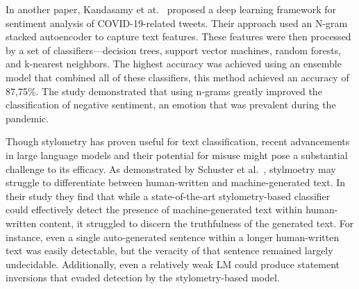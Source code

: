 \documentclass[twoside]{ctuthesis}
\theoremstyle{plain}
\theoremstyle{definition}
\theoremstyle{note}
\begin{document}
In another paper, Kandasamy et at.~\cite{Kandasamy2021COVID} proposed a deep learning framework for sentiment analysis of COVID-19-related tweets. Their approach used an N-gram stacked autoencoder to capture text features. These features were then processed by a set of classifiers—decision trees, support vector machines, random forests, and k‑nearest neighbors. The highest accuracy was achieved using an ensemble model that combined all of these classifiers, this method achieved an accuracy of 87,75\%. The study demonstrated that using n‑grams greatly improved the classification of negative sentiment, an emotion that was prevalent during the pandemic.

Though stylometry has proven useful for text classification, recent advancements in large language models and their potential for misuse might pose a substantial challenge to its efficacy. As demonstrated by Schuster et al.~\cite{Schuster2020}, stylmoetry may struggle to differentiate between human-written and machine-generated text. In their study they find that while a state-of-the-art stylometry-based classifier could effectively detect the presence of machine-generated text within human-written content, it struggled to discern the truthfulness of the generated text.  For instance, even a single auto-generated sentence within a longer human-written text was easily detectable, but the veracity of that sentence remained largely undecidable.  Additionally, even a relatively weak LM could produce statement inversions that evaded detection by the stylometry-based model.


\end{document}
